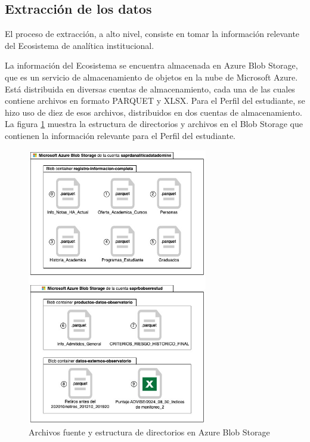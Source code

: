 \subsection{Extracción de los datos}
\label{subsec:extraccion}

El proceso de extracción, a alto nivel, consiste en tomar la información relevante del Ecosistema de analítica institucional.

La información del Ecosistema se encuentra almacenada en \gls{Azure Blob Storage}, que es un servicio de almacenamiento de objetos en la nube de Microsoft Azure. Está distribuida en diversas cuentas de almacenamiento, cada una de las cuales contiene archivos en formato PARQUET y XLSX. Para el Perfil del estudiante, se hizo uso de diez de esos archivos, distribuidos en dos cuentas de almacenamiento. La figura \ref{fig:blob_storage} muestra la estructura de directorios y archivos en el Blob Storage que contienen la información relevante para el Perfil del estudiante.

\begin{figure}[h]
	\centering
	\includegraphics[width=0.7\textwidth]{assets/blob_storage.jpg}
	\caption{Archivos fuente y estructura de directorios en \gls{Azure Blob Storage}}
	\label{fig:blob_storage}
\end{figure}

